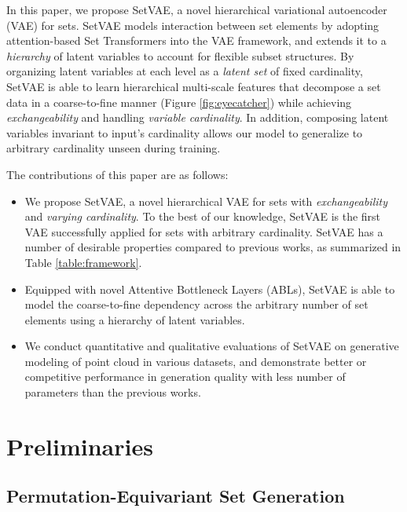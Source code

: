 \documentclass[final]{arxiv/cvpr}
\begin{document}
In this paper, we propose SetVAE, a novel hierarchical variational autoencoder (VAE) for sets. SetVAE models interaction between set elements by adopting attention-based Set Transformers \cite{lee2019set} into the VAE framework, and extends it to a \textit{hierarchy} of latent variables \cite{sonderby2016ladder, vahdat2020nvae} to account for flexible subset structures.
By organizing latent variables at each level as a \textit{latent set} of fixed cardinality, SetVAE is able to learn hierarchical multi-scale features that decompose a set data in a coarse-to-fine manner (Figure \ref{fig:eyecatcher}) while achieving \textit{exchangeability} and handling \textit{variable cardinality}.
In addition, composing latent variables invariant to input's cardinality allows our model to generalize to arbitrary cardinality unseen during training.

The contributions of this paper are as follows:
\begin{itemize}
    \item We propose SetVAE, a novel hierarchical VAE for sets with \textit{exchangeability} and \textit{varying cardinality}.  To the best of our knowledge, SetVAE is the first VAE successfully applied for sets with arbitrary cardinality. SetVAE has a number of desirable properties compared to previous works, as summarized in Table \ref{table:framework}.
    \item Equipped with novel Attentive Bottleneck Layers (ABLs), SetVAE is able to model the coarse-to-fine dependency across the arbitrary number of set elements using a hierarchy of latent variables.
    \item We conduct quantitative and qualitative evaluations of SetVAE on generative modeling of point cloud in various datasets, and demonstrate better or competitive performance in generation quality with less number of parameters than the previous works.
\end{itemize}
 \section{Preliminaries}
\label{sec:preliminary}
\subsection{Permutation-Equivariant Set Generation}
\end{document}
